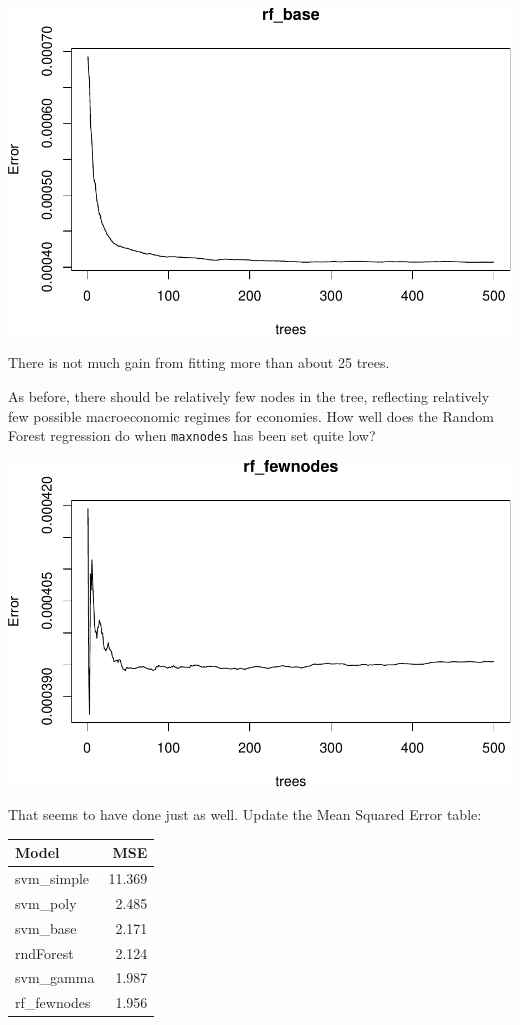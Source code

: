 \documentclass[]{article}
\begin{document}
\includegraphics{Econometric_FX_Forecasting_files/figure-latex/rf-1.pdf}

There is not much gain from fitting more than about 25 trees.

As before, there should be relatively few nodes in the tree, reflecting
relatively few possible macroeconomic regimes for economies. How well
does the Random Forest regression do when \texttt{maxnodes} has been set
quite low?

\includegraphics{Econometric_FX_Forecasting_files/figure-latex/rf_fewnodes-1.pdf}

That seems to have done just as well. Update the Mean Squared Error
table:

\begin{longtable}[]{@{}lr@{}}
\toprule
Model & MSE\tabularnewline
\midrule
\endhead
svm\_simple & 11.369\tabularnewline
svm\_poly & 2.485\tabularnewline
svm\_base & 2.171\tabularnewline
rndForest & 2.124\tabularnewline
svm\_gamma & 1.987\tabularnewline
rf\_fewnodes & 1.956\tabularnewline
\bottomrule
\end{longtable}
\end{document}
